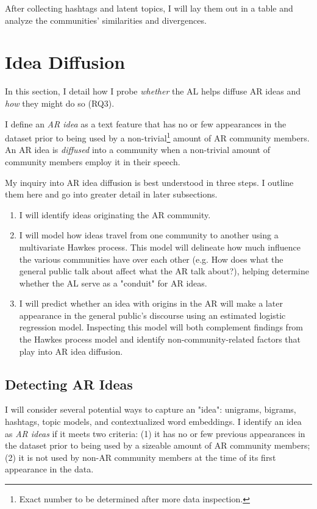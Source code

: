 \documentclass[acmlarge, screen, authorversion]{acmart}
\begin{document}
After collecting hashtags and latent topics, I will lay them out in a table and
analyze the communities' similarities and divergences.

\section{Idea Diffusion}

In this section, I detail how I probe \textit{whether} the AL helps diffuse AR
ideas and \textit{how} they might do so (RQ3).

I define an \textit{AR idea} as a text feature that has no or few
appearances in the dataset prior to being used by a non-trivial\footnote{Exact
number to be determined after more data inspection.} amount of AR community
members. An AR idea is \textit{diffused} into a community when a non-trivial
amount of community members employ it in their speech.

My inquiry into AR idea diffusion is best understood in three steps. I 
outline them here and go into greater detail in later subsections.

\begin{enumerate} 	\item I will identify ideas originating the AR community.
	\item I will model how ideas travel from one community to another using a
multivariate Hawkes process. This model will delineate how much influence the
various communities have over each other (e.g. How does what the general public
talk about affect what the AR talk about?), helping determine whether the AL
serve as a "conduit" for AR ideas. 	
\item I will predict whether an idea with origins
in the AR will make a later appearance in the general public's discourse using
an estimated logistic regression model. Inspecting this model will both
complement findings from the Hawkes process model and identify
non-community-related factors that play into AR idea diffusion. \end{enumerate}

\subsection{Detecting AR Ideas}
I will consider several potential ways to capture an "idea": unigrams, bigrams, 
hashtags, topic models, and contextualized word embeddings. I identify an idea as
\textit{AR ideas} if it meets two criteria: (1) it has no or few previous 
appearances in the dataset prior to being used by a sizeable amount of AR 
community members; (2) it is not used by non-AR community members at the time of its first appearance in the data.
\end{document}

